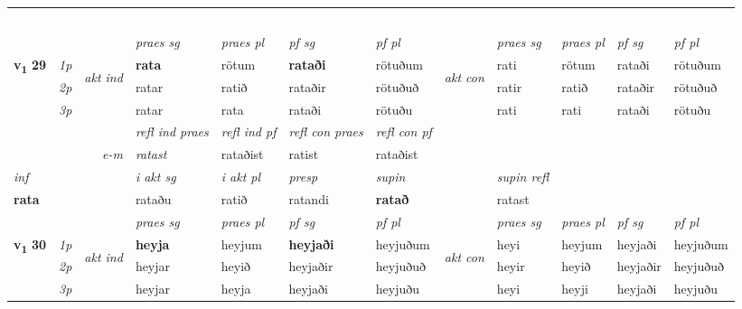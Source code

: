 \begin{longtable}[l]{X>{\footnotesize\itshape}llXXXXlXXXX}
\midrule
& \\*
& \\*
& \\*
& \\*
& \\
\midrule
 & &   & \textit{praes sg}  & \textit{praes pl}    & \textit{ pf sg} & \textit{pf pl} & & \textit{praes sg}  & \textit{praes pl}    & \textit{pf sg} & \textit{pf pl }  \\ \cmidrule{4-7} \cmidrule{9-12}
 \multirow{2}{*}{{{\textbf{v{\textsubscript{1}}} \Large{\textbf{29}}}}}  & 1p & \multirow{3}{*}{\begin{turn}{90}\textit{akt ind}\end{turn}} & \textbf{rata} & rötum & \textbf{rataði} & rötuðum & \multirow{3}{*}{\begin{turn}{90}\textit{akt con}\end{turn}} &rati & rötum & rataði & rötuðum\\*
 & 2p &  &  ratar  & ratið & rataðir & rötuðuð & & ratir & ratið & rataðir & rötuðuð \\*
 & 3p &  & ratar & rata & rataði & rötuðu & & rati & rati& rataði & rötuðu \\*
\cmidrule{4-7} \cmidrule{9-12}

 & && \textit{refl ind praes} & \textit{refl ind pf} & \textit{refl con praes} & \textit{refl con pf} \\*
\multicolumn{3}{r}{\textit{e-m}}& ratast & rataðist & ratist & rataðist \\*

\cmidrule{4-7}
   {\textit{inf}} & &  & \textit{i akt sg} & \textit{i akt pl}   & \textit{presp} & \textit{supin} && \textit{supin refl}  \\*
  {\textbf{rata}} & && rataðu  & ratið   & ratandi &  \textbf{ratað} && ratast  \\*

\midrule

 & &   & \textit{praes sg}  & \textit{praes pl}    & \textit{ pf sg} & \textit{pf pl} & & \textit{praes sg}  & \textit{praes pl}    & \textit{pf sg} & \textit{pf pl }  \\ \cmidrule{4-7} \cmidrule{9-12}
 \multirow{2}{*}{{{\textbf{v{\textsubscript{1}}} \Large{\textbf{30}}}}}  & 1p & \multirow{3}{*}{\begin{turn}{90}\textit{akt ind}\end{turn}} & \textbf{heyja} & heyjum & \textbf{heyjaði} & heyjuðum & \multirow{3}{*}{\begin{turn}{90}\textit{akt con}\end{turn}} &heyi & heyjum & heyjaði & heyjuðum\\*
 & 2p &  &  heyjar  & heyið & heyjaðir & heyjuðuð & & heyir & heyið & heyjaðir & heyjuðuð \\*
 & 3p &  & heyjar & heyja & heyjaði & heyjuðu & & heyi & heyji& heyjaði & heyjuðu \\*
\cmidrule{4-7} \cmidrule{9-12}


\end{longtable}
